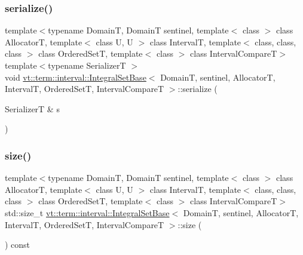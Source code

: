 \mbox{\label{structvt_1_1term_1_1interval_1_1_integral_set_base_aa057be2db33d30cb34a2c8734f7f0278}} 
\subsubsection{\texorpdfstring{serialize()}{serialize()}}
{\footnotesize\ttfamily template$<$typename DomainT, DomainT sentinel, template$<$ class $>$ class AllocatorT, template$<$ class U, U $>$ class IntervalT, template$<$ class, class, class $>$ class Ordered\+SetT, template$<$ class $>$ class Interval\+CompareT$>$ \\
template$<$typename SerializerT $>$ \\
void \hyperlink{structvt_1_1term_1_1interval_1_1_integral_set_base}{vt\+::term\+::interval\+::\+Integral\+Set\+Base}$<$ DomainT, sentinel, AllocatorT, IntervalT, Ordered\+SetT, Interval\+CompareT $>$\+::serialize (\begin{DoxyParamCaption}\item[{SerializerT \&}]{s }\end{DoxyParamCaption})\hspace{0.3cm}{\ttfamily [inline]}}

\mbox{\label{structvt_1_1term_1_1interval_1_1_integral_set_base_aeee10fc1f3ea82698fd50f226fee86dc}} 
\subsubsection{\texorpdfstring{size()}{size()}}
{\footnotesize\ttfamily template$<$typename DomainT, DomainT sentinel, template$<$ class $>$ class AllocatorT, template$<$ class U, U $>$ class IntervalT, template$<$ class, class, class $>$ class Ordered\+SetT, template$<$ class $>$ class Interval\+CompareT$>$ \\
std\+::size\+\_\+t \hyperlink{structvt_1_1term_1_1interval_1_1_integral_set_base}{vt\+::term\+::interval\+::\+Integral\+Set\+Base}$<$ DomainT, sentinel, AllocatorT, IntervalT, Ordered\+SetT, Interval\+CompareT $>$\+::size (\begin{DoxyParamCaption}{ }\end{DoxyParamCaption}) const\hspace{0.3cm}{\ttfamily [inline]}}


